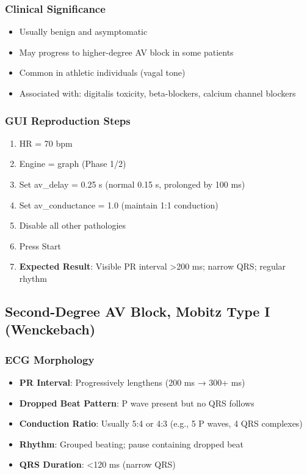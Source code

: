\documentclass[11pt, a4paper]{article}
\begin{document}
\subsubsection{Clinical Significance}
\begin{itemize}
    \item Usually benign and asymptomatic
    \item May progress to higher-degree AV block in some patients
    \item Common in athletic individuals (vagal tone)
    \item Associated with: digitalis toxicity, beta-blockers, calcium channel blockers
\end{itemize}

\subsubsection{GUI Reproduction Steps}
\begin{enumerate}
    \item HR = 70 bpm
    \item Engine = graph (Phase 1/2)
    \item Set av\_delay = 0.25 s (normal 0.15 s, prolonged by 100 ms)
    \item Set av\_conductance = 1.0 (maintain 1:1 conduction)
    \item Disable all other pathologies
    \item Press Start
    \item \textbf{Expected Result}: Visible PR interval >200 ms; narrow QRS; regular rhythm
\end{enumerate}

\subsection{Second-Degree AV Block, Mobitz Type I (Wenckebach)}

\subsubsection{ECG Morphology}
\begin{itemize}
    \item \textbf{PR Interval}: Progressively lengthens (200 ms → 300+ ms)
    \item \textbf{Dropped Beat Pattern}: P wave present but no QRS follows
    \item \textbf{Conduction Ratio}: Usually 5:4 or 4:3 (e.g., 5 P waves, 4 QRS complexes)
    \item \textbf{Rhythm}: Grouped beating; pause containing dropped beat
    \item \textbf{QRS Duration}: <120 ms (narrow QRS)
\end{itemize}
\end{document}
